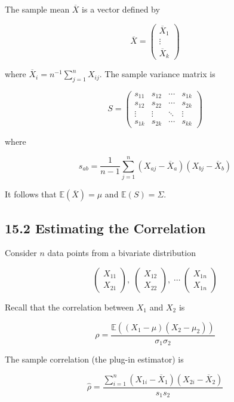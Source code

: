 The sample mean \(\overline{X}\) is a vector defined by

\[\overline{X} = \begin{pmatrix} \overline{X}_{1} \\ \vdots \\ \overline{X}_{k} \end{pmatrix}\]

where \(\overline{X}_{i} = n^{-1} \sum_{j = 1}^{n} X_{ij}\). The sample
variance matrix is

\[ S = \begin{pmatrix} 
s_{11} & s_{12} & \cdots & s_{1k} \\
s_{12} & s_{22} & \cdots & s_{2k} \\
\vdots & \vdots & \ddots & \vdots \\
s_{1k} & s_{2k} & \cdots & s_{kk}
\end{pmatrix} \]

where

\[s_{ab} = \frac{1}{n - 1} \sum_{j = 1}^{n} (X_{aj} - \overline{X}_a) (X_{bj} - \overline{X}_b)\]

It follows that \(\mathbb{E}(\overline{X}) = \mu\) and
\(\mathbb{E}(S) = \Sigma\).

\subsection*{15.2 Estimating the
Correlation}\label{estimating-the-correlation}

Consider \(n\) data points from a bivariate distribution

\[
\begin{pmatrix} X_{11} \\ X_{21}\end{pmatrix}, \;
\begin{pmatrix} X_{12} \\ X_{22}\end{pmatrix}, \;
\cdots \;
\begin{pmatrix} X_{1n} \\ X_{1n}\end{pmatrix}
\]

Recall that the correlation between \(X_{1}\) and \(X_{2}\) is

\[\rho = \frac{\mathbb{E}((X_{1} - \mu) (X_{2} - \mu_{2}))}{\sigma_{1} \sigma_{2}}\]

The sample correlation (the plug-in estimator) is

\[\hat{\rho} = \frac{\sum_{i=1}^{n} (X_{1i} - \overline{X}_{1})(X_{2i} - \overline{X}_{2})}{s_{1} s_{2}}\]

